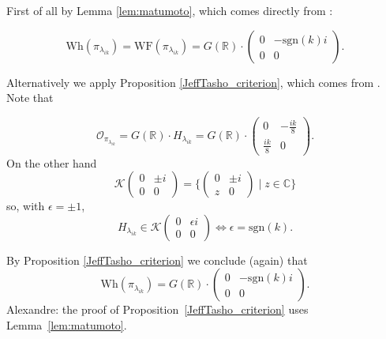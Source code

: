 \documentclass[10pt,leqno]{article}
\numberwithin{equation}{section}
\newcommand{\sgn}{\mathrm{sgn}}
\renewcommand{\O}{\mathcal O}
\newcommand{\R}{\mathbb R}
\newcommand{\C}{\mathbb C}
\newcommand{\K}{\mathcal K}
\newcommand{\Wh}{\mathrm{Wh}}
\newcommand{\WF}{\mathrm{WF}}
\begin{document}
First of all by Lemma \ref{lem:matumoto}, which comes directly from \cite[Theorem A]{matumoto}:




$$
\Wh(\pi_{\lambda_{ik}})=\WF(\pi_{\lambda_{ik}})=G(\R)\cdot \begin{pmatrix}0&-\sgn(k)i\\0&0
\end{pmatrix}.
$$



Alternatively we apply Proposition \ref{JeffTasho_criterion}, which comes from 
\cite{adams_kaletha}. Note that

$$
\O_{\pi_{\lambda_{ik}}}=G(\R)\cdot H_{\lambda_{ik}}=G(\R)\cdot \begin{pmatrix}0&-\frac{ik}8\\\frac{ik}8&0
\end{pmatrix}.
$$
On the other hand
$$
\K
\begin{pmatrix}0&\pm i\\0&0
\end{pmatrix}=\{\begin{pmatrix}0&\pm i\\z&0
\end{pmatrix}\mid z\in\C\}
$$
so, with $\epsilon=\pm 1$, 
$$
H_{\lambda_{ik}}\in \K\begin{pmatrix}0&\epsilon i\\0&0
\end{pmatrix}\Leftrightarrow \epsilon=\sgn(k).
$$


By Proposition \ref{JeffTasho_criterion}
we conclude (again) that
$$
\Wh(\pi_{\lambda_{ik}})=G(\R)\cdot\begin{pmatrix}0&-\sgn(k)i\\0&0
\end{pmatrix}.
$$
Alexandre: the proof of Proposition~\ref{JeffTasho_criterion} uses Lemma~\ref{lem:matumoto}.








\end{document}
